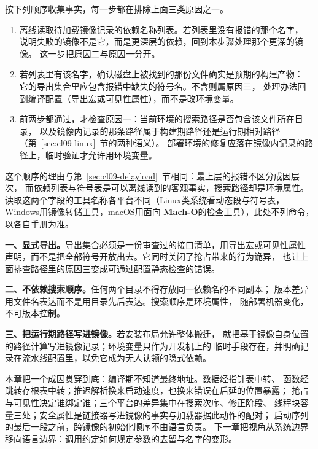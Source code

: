 \documentclass[12pt,a4paper,fontset=fandol]{ctexbook}
\newcommand{\Macho}{\textbf{\textsf{Mach-O}}}
\newcommand{\Nix}{\textsf{Linux}}
\newcommand{\Win}{\textsf{Windows}}
\newcommand{\Mac}{\textsf{macOS}}
\begin{document}
\begin{abibox}[title={运行期找不到库：一条可执行的排查路径}]
  按下列顺序收集事实，每一步都在排除上面三类原因之一。

  \begin{enumerate}
    \item 离线读取待加载镜像记录的依赖名称列表。若列表里没有报错的那个名字，
      说明失败的镜像不是它，而是更深层的依赖，回到本步骤处理那个更深的镜像。
      这一步把原因二与原因一分开。
    \item 若列表里有该名字，确认磁盘上被找到的那份文件确实是预期的构建产物：
      它的导出集合里应包含报错中缺失的符号名。不含则属原因三，
      处理办法回到编译配置（导出宏或可见性属性），而不是改环境变量。
    \item 前两步都通过，才检查原因一：当前环境的搜索路径是否包含该文件所在目录，
      以及镜像内记录的那条路径属于构建期路径还是运行期相对路径
      （第~\ref{sec:cl09-linux}~节的两种语义）。
      部署环境的修复应落在镜像内记录的路径上，临时验证才允许用环境变量。
  \end{enumerate}

  这个顺序的理由与第~\ref{sec:cl09-delayload}~节相同：最上层的报错不区分成因层次，
  而依赖列表与符号表是可以离线读到的客观事实，搜索路径却是环境属性。
  读取这两个字段的工具名称各平台不同（\Nix 类系统看动态段与符号表，
  \Win 用镜像转储工具，\Mac 用面向 \Macho 的检查工具），此处不列命令，以各自手册为准。
\end{abibox}

\begin{guideline}[title={跨平台库的三条链接期纪律}]
  \textbf{一、显式导出。}导出集合必须是一份审查过的接口清单，用导出宏或可见性属性
  声明，而不是把全部符号开放出去。它同时关闭了抢占带来的行为诡异，
  也让上面排查路径里的原因三变成可通过配置静态检查的错误。

  \textbf{二、不依赖搜索顺序。}任何两个目录不得存放同一依赖名的不同副本；
  版本差异用文件名表达而不是用目录先后表达。搜索顺序是环境属性，
  随部署机器变化，不可版本控制。

  \textbf{三、把运行期路径写进镜像。}若安装布局允许整体搬迁，
  就把基于镜像自身位置的路径计算写进镜像记录；环境变量只作为开发机上的
  临时手段存在，并明确记录在流水线配置里，以免它成为无人认领的隐式依赖。
\end{guideline}

\begin{note}[title={本章小结}]
  本章把一个成因贯穿到底：编译期不知道最终地址。数据经指针表中转、
  函数经跳转存根表中转；推迟解析换来启动速度，也换来错误在后延的位置暴露；
  抢占与可见性决定谁绑定谁；三个平台的差异集中在搜索次序、修正阶段、
  线程块容量三处；安全属性是链接器写进镜像的事实与加载器据此动作的配对；
  启动序列的最后一段之前，跨镜像的初始化顺序不由语言负责。
  下一章把视角从系统边界移向语言边界：调用约定如何规定参数的去留与名字的变形。
\end{note}
\end{document}
